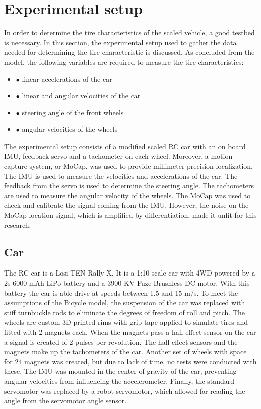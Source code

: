 \section{Experimental setup}
 
In order to determine the tire characteristics of the scaled vehicle, a good testbed is necessary. In this section, the experimental setup used to gather the data needed for determining the tire characteristic is discussed. As concluded from the model, the following variables are required to measure the tire characteristics: 
\begin{itemize}
	\item$\bullet$ linear accelerations of the car
    \item$\bullet$ linear and angular velocities of the car
    \item$\bullet$ steering angle of the front wheels
    \item$\bullet$ angular velocities of the wheels
\end{itemize}
The experimental setup consists of a modified scaled RC car with an on board IMU, feedback servo and a tachometer on each wheel. Moreover, a motion capture system, or MoCap, was used to provide millimeter precision localization. The IMU is used to measure the velocities and accelerations of the car. The feedback from the servo is used to determine the steering angle. The tachometers are used to measure the angular velocity of the wheels. The MoCap was used to check and calibrate the signal coming from the IMU. However, the noise on the MoCap location signal, which is amplified by differentiation, made it unfit for this research.

\subsection{Car}
The RC car is a Losi TEN Rally-X. It is a 1:10 scale car with 4WD powered by a 2s 6000 mAh LiPo battery and a 3900 KV Fuze Brushless DC motor. With this battery the car is able drive at speeds between 1.5 and 15 m/s.  To meet the assumptions of the Bicycle model, the suspension of the car was replaced with stiff turnbuckle rods to eliminate the degrees of freedom of roll and pitch. The wheels are custom 3D-printed rims with grip tape applied to simulate tires and fitted with 2 magnets each. When the magnets pass a hall-effect sensor on the car a signal is created of 2 pulses per revolution. The hall-effect sensors and the magnets make up the tachometers of the car. Another set of wheels with space for 24 magnets was created, but due to lack of time, no tests were conducted with these. The IMU was mounted in the center of gravity of the car, preventing angular velocities from influencing the accelerometer. Finally, the standard servomotor was replaced by a robot servomotor, which allowed for reading the angle from the servomotor angle sensor.

